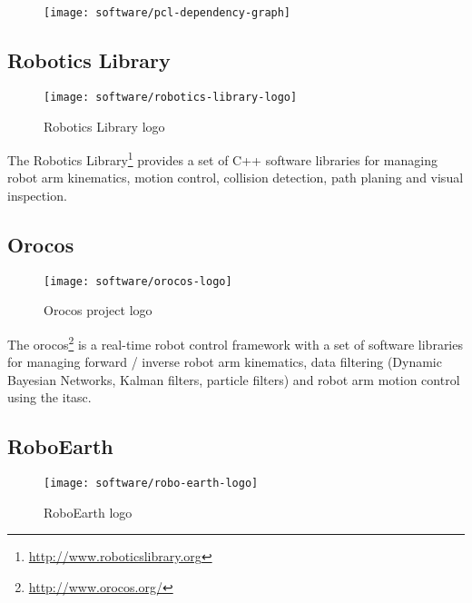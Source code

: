 \begin{figure}[H]
	\centering
	\texttt{[image: software/pcl-dependency-graph]}
	\caption[]{\protect\footnotemark}
	\label{fig:pcl-dependency-graph}
\end{figure}


\subsection{Robotics Library}

\begin{wrapfigure}{r}{0.23\textwidth}
	\centering
	\vspace*{-2em}
	\texttt{[image: software/robotics-library-logo]}
	\caption{Robotics Library logo}
	\label{fig:robotics-library-logo}
\end{wrapfigure}

The Robotics Library\footnote{\url{http://www.roboticslibrary.org}} provides a set of C++ software libraries for managing robot arm kinematics, motion control, collision detection, path planing and visual inspection.


\subsection{Orocos}

\begin{wrapfigure}{r}{0.23\textwidth}
	\centering
	\vspace*{-2em}
	\texttt{[image: software/orocos-logo]}
	\caption{Orocos project logo}
	\label{fig:orocos-logo}
\end{wrapfigure}

The \gls{orocos}\footnote{\url{http://www.orocos.org/}} is a real-time robot control framework with a set of software libraries for managing forward / inverse robot arm kinematics, data filtering (Dynamic Bayesian Networks, Kalman filters, particle filters) and robot arm motion control using the \gls{itasc}.




\subsection{RoboEarth}

\begin{wrapfigure}{r}{0.23\textwidth}
	\centering
	\vspace*{-2em}
	\texttt{[image: software/robo-earth-logo]}
	\caption{RoboEarth logo}
	\label{fig:robo-earth-logo}
\end{wrapfigure}

